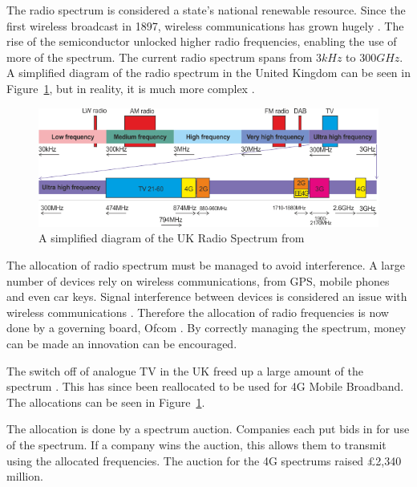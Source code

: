 {}


The radio spectrum is considered a state's national renewable resource.
Since the first wireless broadcast in 1897, wireless communications has grown hugely \citeneeded{}.
The rise of the semiconductor unlocked higher radio frequencies, enabling the use of more of the spectrum.
The current radio spectrum spans from $3kHz$ to $300 GHz$. 
A simplified diagram of the radio spectrum in the United Kingdom can be seen in Figure~\ref{c3:ukspectrum}, but in reality, it is much more complex \cite{roke:ukspectrum}.

\begin{figure}
\includegraphics[width=\textwidth]{Figures/radiospectrum.png}
\caption{A simplified diagram of the UK Radio Spectrum from \cite{ukfreetv}}
\label{c3:ukspectrum}
\end{figure}

The allocation of radio spectrum must be managed to avoid interference. 
A large number of devices rely on wireless communications, from GPS, mobile phones and even car keys.
Signal interference between devices is considered an issue with wireless communications \cite{GPS}. 
Therefore the allocation of radio frequencies is now done by a governing board, Ofcom \cite{ofcom:whatis}.
By correctly managing the spectrum, money can be made an innovation can be encouraged.

The switch off of analogue TV in the UK freed up a large amount of the spectrum \cite{ofcom:tv}.
This has since been reallocated to be used for 4G Mobile Broadband.
The allocations can be seen in Figure~\ref{c3:ukspectrum}.

The allocation is done by a spectrum auction.
Companies each put bids in for use of the spectrum. 
If a company wins the auction, this allows them to transmit using the allocated frequencies. 
The auction for the 4G spectrums raised \pounds 2,340 million. 

